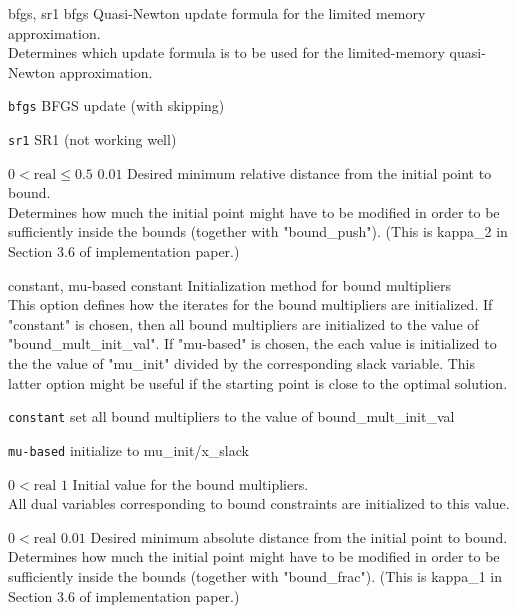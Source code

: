 %
{\ttfamily bfgs, sr1}%
{bfgs}%
{Quasi-Newton update formula for the limited memory approximation.\\
Determines which update formula is to be used for the limited-memory quasi-Newton approximation.}%
{\begin{list}{}{
\setlength{\parsep}{0em}
\setlength{\leftmargin}{5ex}
\setlength{\labelwidth}{2ex}
\setlength{\itemindent}{0ex}
\setlength{\topsep}{0pt}}
\item[\texttt{bfgs}] BFGS update (with skipping)
\item[\texttt{sr1}] SR1 (not working well)
\end{list}
}

%
{$0<\textrm{real}\leq0.5$}%
{$0.01$}%
{Desired minimum relative distance from the initial point to bound.\\
Determines how much the initial point might have to be modified in order to be sufficiently inside the bounds (together with "bound\_push").  (This is kappa\_2 in Section 3.6 of implementation paper.)}%
{}

%
{\ttfamily constant, mu-based}%
{constant}%
{Initialization method for bound multipliers\\
This option defines how the iterates for the bound multipliers are initialized.  If "constant" is chosen, then all bound multipliers are initialized to the value of "bound\_mult\_init\_val".  If "mu-based" is chosen, the each value is initialized to the the value of "mu\_init" divided by the corresponding slack variable.  This latter option might be useful if the starting point is close to the optimal solution.}%
{\begin{list}{}{
\setlength{\parsep}{0em}
\setlength{\leftmargin}{5ex}
\setlength{\labelwidth}{2ex}
\setlength{\itemindent}{0ex}
\setlength{\topsep}{0pt}}
\item[\texttt{constant}] set all bound multipliers to the value of bound\_mult\_init\_val
\item[\texttt{mu-based}] initialize to mu\_init/x\_slack
\end{list}
}

%
{$0<\textrm{real}$}%
{$1$}%
{Initial value for the bound multipliers.\\
All dual variables corresponding to bound constraints are initialized to this value.}%
{}

%
{$0<\textrm{real}$}%
{$0.01$}%
{Desired minimum absolute distance from the initial point to bound.\\
Determines how much the initial point might have to be modified in order to be sufficiently inside the bounds (together with "bound\_frac").  (This is kappa\_1 in Section 3.6 of implementation paper.)}%
{}

